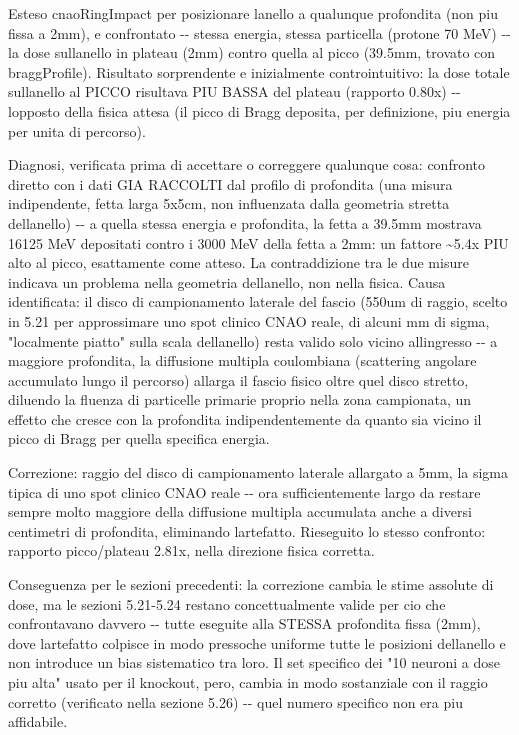 \documentclass[
  italian,
]{article}
\begin{document}
Esteso cnaoRingImpact per posizionare l\textquotesingle anello a qualunque profondita\textquotesingle{} (non piu\textquotesingle{} fissa a 2mm), e confrontato -\/- stessa energia, stessa particella (protone 70 MeV) -\/- la dose sull\textquotesingle anello in plateau (2mm) contro quella al picco (39.5mm, trovato con braggProfile). Risultato sorprendente e inizialmente controintuitivo: la dose totale sull\textquotesingle anello al PICCO risultava PIU\textquotesingle{} BASSA del plateau (rapporto 0.80x) -\/- l\textquotesingle opposto della fisica attesa (il picco di Bragg deposita, per definizione, piu\textquotesingle{} energia per unita\textquotesingle{} di percorso).

Diagnosi, verificata prima di accettare o correggere qualunque cosa: confronto diretto con i dati GIA\textquotesingle{} RACCOLTI dal profilo di profondita\textquotesingle{} (una misura indipendente, fetta larga 5x5cm, non influenzata dalla geometria stretta dell\textquotesingle anello) -\/- a quella stessa energia e profondita\textquotesingle, la fetta a 39.5mm mostrava 16125 MeV depositati contro i 3000 MeV della fetta a 2mm: un fattore \textasciitilde5.4x PIU\textquotesingle{} alto al picco, esattamente come atteso. La contraddizione tra le due misure indicava un problema nella geometria dell\textquotesingle anello, non nella fisica. Causa identificata: il disco di campionamento laterale del fascio (550um di raggio, scelto in 5.21 per approssimare uno spot clinico CNAO reale, di alcuni mm di sigma, "localmente piatto" sulla scala dell\textquotesingle anello) resta valido solo vicino all\textquotesingle ingresso -\/- a maggiore profondita\textquotesingle, la diffusione multipla coulombiana (scattering angolare accumulato lungo il percorso) allarga il fascio fisico oltre quel disco stretto, diluendo la fluenza di particelle primarie proprio nella zona campionata, un effetto che cresce con la profondita\textquotesingle{} indipendentemente da quanto sia vicino il picco di Bragg per quella specifica energia.

Correzione: raggio del disco di campionamento laterale allargato a 5mm, la sigma tipica di uno spot clinico CNAO reale -\/- ora sufficientemente largo da restare sempre molto maggiore della diffusione multipla accumulata anche a diversi centimetri di profondita\textquotesingle, eliminando l\textquotesingle artefatto. Rieseguito lo stesso confronto: rapporto picco/plateau 2.81x, nella direzione fisica corretta.

Conseguenza per le sezioni precedenti: la correzione cambia le stime assolute di dose, ma le sezioni 5.21-5.24 restano concettualmente valide per cio\textquotesingle{} che confrontavano davvero -\/- tutte eseguite alla STESSA profondita\textquotesingle{} fissa (2mm), dove l\textquotesingle artefatto colpisce in modo pressoche\textquotesingle{} uniforme tutte le posizioni dell\textquotesingle anello e non introduce un bias sistematico tra loro. Il set specifico dei "10 neuroni a dose piu\textquotesingle{} alta" usato per il knockout, pero\textquotesingle, cambia in modo sostanziale con il raggio corretto (verificato nella sezione 5.26) -\/- quel numero specifico non era piu\textquotesingle{} affidabile.
\end{document}
